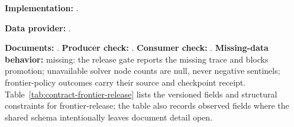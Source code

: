 \noindent\textbf{Implementation:} .\par
\noindent\textbf{Data provider:} .\par
\textbf{Documents:} . \textbf{Producer check:} . \textbf{Consumer check:} . \textbf{Missing-data behavior:} missing: the release gate reports the missing trace and blocks promotion; unavailable solver node counts are null, never negative sentinels; frontier-policy outcomes carry their source and checkpoint receipt. %
Table~\ref{tab:contract-frontier-release} lists the versioned fields and structural constraints for frontier-release; the table also records observed fields where the shared schema intentionally leaves document detail open.
